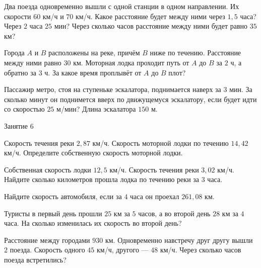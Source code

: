 \begin{class}[number=5]
\begin{listofex}
		\item  Два поезда одновременно вышли с одной станции в одном направлении. Их скорости \( 60 \) км/ч и \( 70 \) км/ч. Какое расстояние будет между ними через \( 1,5 \) часа? Через \( 2  \) часа \( 25  \) мин? Через сколько часов расстояние между ними будет равно \( 35 \) км?
		\item Города \( A \) и \( B \) расположены на реке, причём \( B \) ниже по течению. Расстояние между 
		ними равно \( 30 \) км. Моторная лодка проходит путь от \( A \) до \( B \) за \( 2 \) ч, а обратно за \( 3 \) ч. За какое время проплывёт от \( A \) до \( B \) плот?
		\item  Пассажир метро, стоя на ступеньке эскалатора, поднимается наверх за \( 3 \) мин. За сколько 
		минут он поднимется вверх по движущемуся эскалатору, если будет идти со скоростью \( 25 \) м/мин? Длина эскалатора \( 150 \) м.
	\end{listofex}
\end{class}

\begin{class}[number=6]
	\begin{listofex}
		\item Занятие 6
	\end{listofex}
\end{class}

\begin{homework}[number=3]
	\begin{listofex}
		\item Скорость течения реки \( 2,87 \) км/ч. Скорость моторной лодки по течению \( 14,42 \) км/ч. Определите собственную скорость моторной лодки.
		\item Собственная скорость лодки \( 12,5 \) км/ч. Скорость течения реки \( 3,02 \) км/ч. Найдите сколько километров прошла лодка по течению реки за 3 часа.
		\item  Найдите скорость автомобиля, если за \( 4 \) часа он проехал \( 261,08 \) км.
		\item Туристы в первый день прошли \( 25 \) км за \( 5 \) часов, а во второй день \( 28 \) км за \( 4 \) часа. На сколько изменилась их скорость во второй день?
		\item Расстояние между городами \( 930 \) км. Одновременно навстречу друг другу вышли \( 2 \) поезда. Скорость одного \( 45 \) км/ч, другого --- \( 48 \) км/ч. Через сколько часов поезда встретились?
	\end{listofex}
\end{homework}

